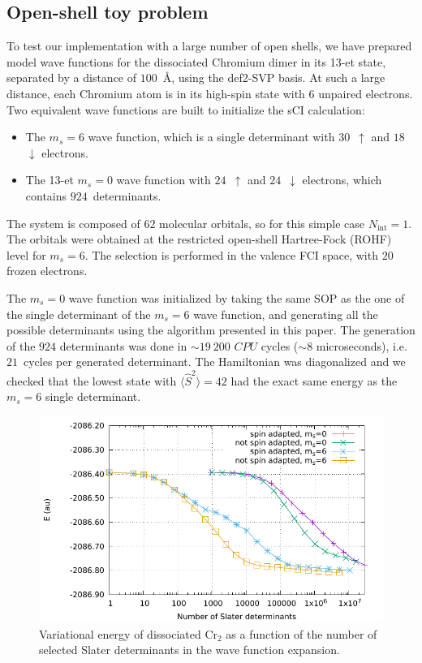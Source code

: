 \documentclass[aip,jcp,reprint,showkeys]{revtex4-1}
\newcommand{\stwo}{\hat{S}^2}
\newcommand{\up}{\uparrow}
\newcommand{\dn}{\downarrow}
\newcommand{\Nint}{{N_\text{int}}}
\newcommand{\sop}{SOP}
\newcommand{\sci}{sCI}
\newcommand{\cpu}{CPU}
\begin{document}
\subsection{Open-shell toy problem}

To test our implementation with a large number of open shells, we have prepared
model wave functions for the dissociated Chromium dimer in its 13-et state, separated by a
distance of $100$~\AA, using the def2-SVP basis.\cite{Weigend_2005}
At such a large distance, each Chromium atom is in its high-spin state with $6$
unpaired electrons. Two equivalent wave functions are built to initialize the {\sci}
calculation:
\begin{itemize}
\item The $m_s=6$ wave function, which is a single determinant with $30$~$\up$
      and $18$ $\dn$ electrons.
\item The 13-et $m_s=0$ wave function with $24$~$\up$ and $24$~$\dn$ electrons, which
      contains $924$~determinants.
\end{itemize}
The system is composed of $62$ molecular orbitals, so for this simple case $\Nint=1$.
The orbitals were obtained at the restricted open-shell Hartree-Fock (ROHF) level
for $m_s=6$.
The selection is performed in the valence FCI space, with $20$ frozen electrons.

The $m_s=0$ wave function was initialized by taking the same {\sop} as the
one of the single determinant of the $m_s=6$ wave function, and generating all
the possible determinants using the algorithm presented in this paper.
The generation of the $924$ determinants was done in $\sim 19~200$
$\cpu$ cycles ($\sim8$ microseconds), i.e.  $21$~cycles per generated determinant. The Hamiltonian was
diagonalized and we checked that the lowest state with $\langle \stwo \rangle =
42$ had the exact same energy as the $m_s=6$ single determinant.

\begin{figure}
\includegraphics[width=0.9\columnwidth]{e_var_ndet}
\caption{Variational energy of dissociated Cr$_2$ as a function of the number of
selected Slater determinants in the wave function expansion.}
\label{fig:e_var_ndet}
\end{figure}
\end{document}
